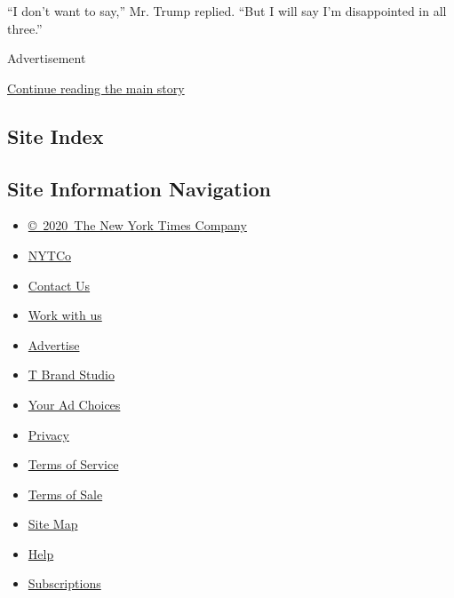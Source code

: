 ``I don't want to say,'' Mr. Trump replied. ``But I will say I'm
disappointed in all three.''

Advertisement

\protect\hyperlink{after-bottom}{Continue reading the main story}

\hypertarget{site-index}{%
\subsection{Site Index}\label{site-index}}

\hypertarget{site-information-navigation}{%
\subsection{Site Information
Navigation}\label{site-information-navigation}}

\begin{itemize}
\tightlist
\item
  \href{https://help.nytimes3xbfgragh.onion/hc/en-us/articles/115014792127-Copyright-notice}{©~2020~The
  New York Times Company}
\end{itemize}

\begin{itemize}
\tightlist
\item
  \href{https://www.nytco.com/}{NYTCo}
\item
  \href{https://help.nytimes3xbfgragh.onion/hc/en-us/articles/115015385887-Contact-Us}{Contact
  Us}
\item
  \href{https://www.nytco.com/careers/}{Work with us}
\item
  \href{https://nytmediakit.com/}{Advertise}
\item
  \href{http://www.tbrandstudio.com/}{T Brand Studio}
\item
  \href{https://www.nytimes3xbfgragh.onion/privacy/cookie-policy\#how-do-i-manage-trackers}{Your
  Ad Choices}
\item
  \href{https://www.nytimes3xbfgragh.onion/privacy}{Privacy}
\item
  \href{https://help.nytimes3xbfgragh.onion/hc/en-us/articles/115014893428-Terms-of-service}{Terms
  of Service}
\item
  \href{https://help.nytimes3xbfgragh.onion/hc/en-us/articles/115014893968-Terms-of-sale}{Terms
  of Sale}
\item
  \href{https://spiderbites.nytimes3xbfgragh.onion}{Site Map}
\item
  \href{https://help.nytimes3xbfgragh.onion/hc/en-us}{Help}
\item
  \href{https://www.nytimes3xbfgragh.onion/subscription?campaignId=37WXW}{Subscriptions}
\end{itemize}
